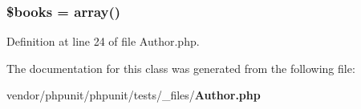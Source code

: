 \subsubsection[{\$books}]{\setlength{\rightskip}{0pt plus 5cm}\$books = array()}\label{class_author_a907555e6b68ea0e7a98690e57bc2878a}


Definition at line 24 of file Author.\+php.



The documentation for this class was generated from the following file\+:\begin{DoxyCompactItemize}
\item 
vendor/phpunit/phpunit/tests/\+\_\+files/{\bf Author.\+php}\end{DoxyCompactItemize}

